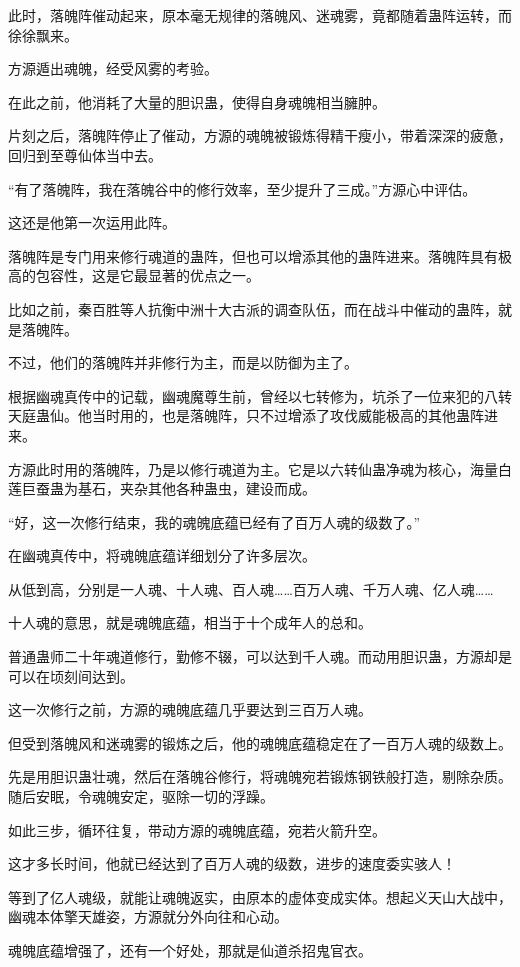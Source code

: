 \begin{this_body}
此时，落魄阵催动起来，原本毫无规律的落魄风、迷魂雾，竟都随着蛊阵运转，而徐徐飘来。

方源遁出魂魄，经受风雾的考验。

在此之前，他消耗了大量的胆识蛊，使得自身魂魄相当臃肿。

片刻之后，落魄阵停止了催动，方源的魂魄被锻炼得精干瘦小，带着深深的疲惫，回归到至尊仙体当中去。

“有了落魄阵，我在落魄谷中的修行效率，至少提升了三成。”方源心中评估。

这还是他第一次运用此阵。

落魄阵是专门用来修行魂道的蛊阵，但也可以增添其他的蛊阵进来。落魄阵具有极高的包容性，这是它最显著的优点之一。

比如之前，秦百胜等人抗衡中洲十大古派的调查队伍，而在战斗中催动的蛊阵，就是落魄阵。

不过，他们的落魄阵并非修行为主，而是以防御为主了。

根据幽魂真传中的记载，幽魂魔尊生前，曾经以七转修为，坑杀了一位来犯的八转天庭蛊仙。他当时用的，也是落魄阵，只不过增添了攻伐威能极高的其他蛊阵进来。

方源此时用的落魄阵，乃是以修行魂道为主。它是以六转仙蛊净魂为核心，海量白莲巨蚕蛊为基石，夹杂其他各种蛊虫，建设而成。

“好，这一次修行结束，我的魂魄底蕴已经有了百万人魂的级数了。”

在幽魂真传中，将魂魄底蕴详细划分了许多层次。

从低到高，分别是一人魂、十人魂、百人魂……百万人魂、千万人魂、亿人魂……

十人魂的意思，就是魂魄底蕴，相当于十个成年人的总和。

普通蛊师二十年魂道修行，勤修不辍，可以达到千人魂。而动用胆识蛊，方源却是可以在顷刻间达到。

这一次修行之前，方源的魂魄底蕴几乎要达到三百万人魂。

但受到落魄风和迷魂雾的锻炼之后，他的魂魄底蕴稳定在了一百万人魂的级数上。

先是用胆识蛊壮魂，然后在落魄谷修行，将魂魄宛若锻炼钢铁般打造，剔除杂质。随后安眠，令魂魄安定，驱除一切的浮躁。

如此三步，循环往复，带动方源的魂魄底蕴，宛若火箭升空。

这才多长时间，他就已经达到了百万人魂的级数，进步的速度委实骇人！

等到了亿人魂级，就能让魂魄返实，由原本的虚体变成实体。想起义天山大战中，幽魂本体擎天雄姿，方源就分外向往和心动。

魂魄底蕴增强了，还有一个好处，那就是仙道杀招鬼官衣。


\end{this_body}

